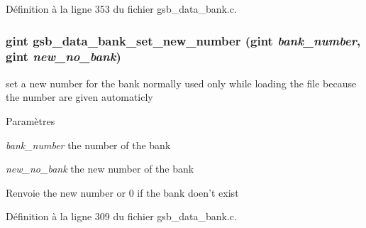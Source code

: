 Définition à la ligne 353 du fichier gsb\_\-data\_\-bank.c.

\subsubsection[{gsb\_\-data\_\-bank\_\-set\_\-new\_\-number}]{\setlength{\rightskip}{0pt plus 5cm}gint gsb\_\-data\_\-bank\_\-set\_\-new\_\-number (gint {\em bank\_\-number}, \/  gint {\em new\_\-no\_\-bank})}\label{gsb__data__bank_8h_a04e6cd7771a2c708cde892d8ff6718a8}
set a new number for the bank normally used only while loading the file because the number are given automaticly


\begin{DoxyParams}{Paramètres}
\item[{\em bank\_\-number}]the number of the bank \item[{\em new\_\-no\_\-bank}]the new number of the bank\end{DoxyParams}
\begin{DoxyReturn}{Renvoie}
the new number or 0 if the bank doen't exist 
\end{DoxyReturn}


Définition à la ligne 309 du fichier gsb\_\-data\_\-bank.c.

